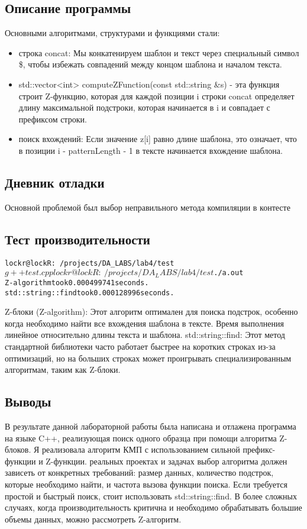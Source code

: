 \documentclass[12pt]{article}
\begin{document}
\subsection*{Описание программы}
Основными алгоритмами, структурами и функциями стали:
\begin{itemize}
\item строка concat: Мы конкатенируем шаблон и текст через специальный символ \$, чтобы избежать совпадений между концом шаблона и началом текста.

\item std::vector<int> computeZFunction(const std::string &s) - эта функция строит Z-функцию, которая для каждой позиции i строки concat определяет длину максимальной подстроки, которая начинается в i и совпадает с префиксом строки.

\item поиск вхождений: Если значение z[i] равно длине шаблона, это означает, что в позиции i - patternLength - 1 в тексте начинается вхождение шаблона.

\end{itemize}

\subsection*{Дневник отладки}

Основной проблемой был выбор неправильного метода компиляции в контесте

\subsection*{Тест производительности}
\begin{alltt}
	lockr@lockR:~/projects/DA_LABS/lab4/test$ g++ test.cpp
	lockr@lockR:~/projects/DA_LABS/lab4/test$ ./a.out
	Z-algorithm took 0.000499741 seconds.
	std::string::find took 0.000128996 seconds.
\end{alltt}
Z-блоки (Z-algorithm): Этот алгоритм оптимален для поиска подстрок, особенно когда необходимо найти все вхождения шаблона в тексте. Время выполнения линейное относительно длины текста и шаблона.
std::string::find: Этот метод стандартной библиотеки часто работает быстрее на коротких строках из-за оптимизаций, но на больших строках может проигрывать специализированным алгоритмам, таким как Z-блоки.

\subsection*{Выводы}

В результате данной лабораторной работы была написана и отлажена программа на языке C++, реализующая поиск одного образца при помощи алгоритма Z-блоков. Я реализовала алгоритм КМП с использованием сильной префикс-функции и Z-функции.  
реальных проектах и задачах выбор алгоритма должен зависеть от конкретных требований: размер данных, количество подстрок, которые необходимо найти, и частота вызова функции поиска. Если требуется простой и быстрый поиск, стоит использовать std::string::find. В более сложных случаях, когда производительность критична и необходимо обрабатывать большие объемы данных, можно рассмотреть Z-алгоритм.
\end{document}
